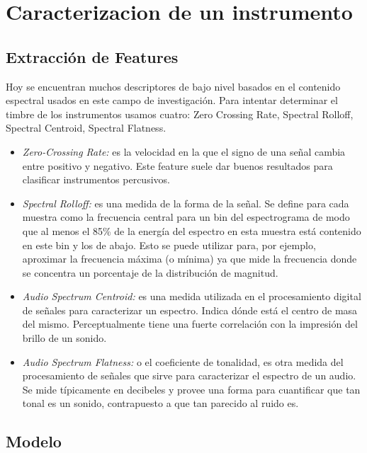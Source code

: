 \section{Caracterizacion de un instrumento}

\subsection{Extracci\'on de Features}

Hoy se encuentran muchos descriptores de bajo nivel basados en el contenido espectral usados en este campo de investigación. Para intentar determinar el timbre de los instrumentos usamos cuatro: Zero Crossing Rate, Spectral Rolloff, Spectral Centroid, Spectral Flatness.

\begin{itemize}
    \item \textit{Zero-Crossing Rate:}  es la velocidad en la que el signo de una señal cambia entre positivo y negativo. Este feature suele dar buenos resultados para clasificar instrumentos percusivos.
        
    \item \textit{Spectral Rolloff:} es una medida de la forma de la señal. Se define para cada muestra como la frecuencia central para un bin del espectrograma de modo que al menos el 85\% de la energía del espectro en esta muestra está contenido en este bin y los de abajo. Esto se puede utilizar para, por ejemplo, aproximar la frecuencia máxima (o mínima) ya que mide la frecuencia donde se concentra un porcentaje de la distribución de magnitud.
        
    \item \textit{Audio Spectrum Centroid:} es una medida utilizada en el procesamiento digital de señales para caracterizar un espectro. Indica dónde está el centro de masa del mismo. Perceptualmente tiene una fuerte correlación con la impresión del brillo de un sonido.
        
    \item \textit{Audio Spectrum Flatness:} o el coeficiente de tonalidad, es otra medida del procesamiento de señales que sirve para caracterizar el espectro de un audio. Se mide típicamente en decibeles y provee una forma para cuantificar que tan tonal es un sonido, contrapuesto a que tan parecido al ruido es.
\end{itemize}

\subsection{Modelo}
\label{sec:modelo}


